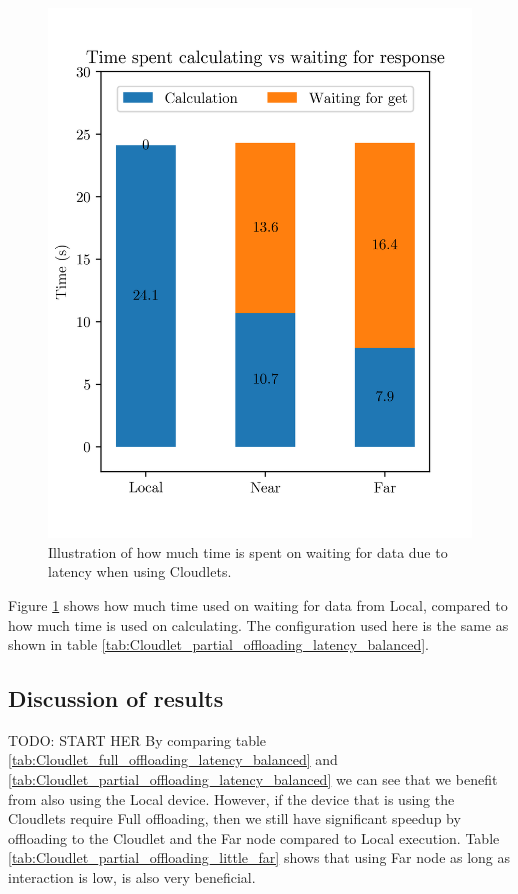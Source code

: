 \begin{figure}[t]
    \centering
    \includegraphics[scale=1]{chapters/evaluation/figures/bar_local_near_far_compare_low_interaction.png}
    \caption{Illustration of how much time is spent on waiting for data due to latency when using Cloudlets.}
    \label{fig:Cloudlet_latency_bar}
\end{figure}
Figure \ref{fig:Cloudlet_latency_bar} shows how much time used on waiting for data from Local, compared to how much time is used on calculating. The configuration used here is the same as shown in table \ref{tab:Cloudlet_partial_offloading_latency_balanced}.



\subsection{Discussion of results}
TODO: START HER
By comparing table \ref{tab:Cloudlet_full_offloading_latency_balanced} and \ref{tab:Cloudlet_partial_offloading_latency_balanced} we can see that we benefit from also using the Local device. However, if the device that is using the Cloudlets require Full offloading, then we still have significant speedup by offloading to the Cloudlet and the Far node compared to Local execution. Table \ref{tab:Cloudlet_partial_offloading_little_far} shows that using Far node as long as interaction is low, is also very beneficial.

